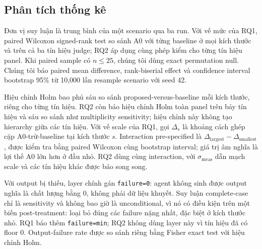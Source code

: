 \subsection{Phân tích thống kê}
\label{sec:stats}

Đơn vị suy luận là trung bình của một scenario qua ba run. Với vế mức của RQ1,
paired Wilcoxon signed-rank test so sánh A0 với từng baseline ở mọi kích thước và
trên cả ba tín hiệu judge; RQ2 áp dụng cùng phép kiểm cho từng tín hiệu panel.
Khi paired sample có $n\leq25$, chúng tôi dùng exact permutation null. Chúng tôi
báo paired mean difference, rank-biserial effect và confidence interval bootstrap
95\% từ 10{,}000 lần resample scenario với seed 42.

Hiệu chỉnh Holm bao phủ sáu so sánh proposed-versus-baseline mỗi kích thước,
riêng cho từng tín hiệu. RQ2 còn báo hiệu chỉnh Holm toàn panel trên bảy tín hiệu
và sáu so sánh như multiplicity sensitivity; hiệu chỉnh này không tạo hierarchy
giữa các tín hiệu. Với vế scale của RQ1, gọi $\Delta_s$ là khoảng cách ghép cặp
A0-trừ-baseline tại kích thước $s$. Interaction pre-specified là
$\Delta_{\mathrm{largest}}-\Delta_{\mathrm{smallest}}$, được kiểm tra bằng paired
Wilcoxon cùng bootstrap interval; giá trị âm nghĩa là lợi thế A0 lớn hơn ở đầu
nhỏ. RQ2 dùng cùng interaction, với $\sigma_{\mathrm{meas}}$
dẫn mạch scale và các tín hiệu khác được báo song song.

Với output bị thiếu, layer chính gán \texttt{failure=0}: agent không sinh được
output nghĩa là chất lượng bằng 0, không phải dữ liệu khuyết. Suy luận
complete-case chỉ là sensitivity và không bao giờ là unconditional, vì nó có điều
kiện trên một biến post-treatment: loại bỏ đúng các failure nặng nhất, đặc biệt ở
kích thước nhỏ. RQ1 báo thêm \texttt{failure=min}; RQ2 không dùng layer này vì
tín hiệu đã có floor 0. Output-failure rate được so sánh riêng bằng Fisher exact
test với hiệu chỉnh Holm.
